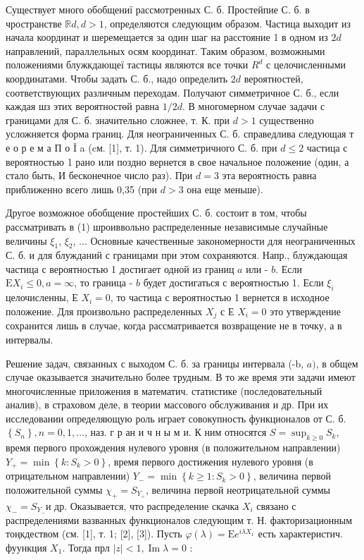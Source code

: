 \documentclass[10pt]{article}
\begin{document}
Существует много обобщениї рассмотренных С. б. Простейпие С. б. в чространстве $\mathbb{R} d, d>1$, определяются следующим образом. Частица выходит из начала координат и шеремещается за один шаг на расстояние 1 в одном из $2 d$ направлений, параллельных осям координат. Таким образом, возможными положениями блужкдающеї тастицы являются все точки $R^{d}$ с целочисленными координатами. Чтобы задать С. б., надо определить $2 d$ вероятностей, соответствующих различным переходам. Получают симметричное С. б., если каждая шз этих вероятностөй равна $1 / 2 d$. В многомерном случае задачи с границами для С. б. значительно сложнее, т. К. при $d>1$ существенно усложняется форма границ. Для неограниченных С. б. справедлива следующая т е о р е м а П о Ĭ a (cм. [1], т. 1). Для симметричного С. б. при $d \leqslant 2$ частица с вероятностью 1 рано или поздно вернется в свое начальное положение (один, а стало быть, И бесконечное число раз). При $d=3$ эта вероятность равна приближенно всего лишь 0,35 (при $d>3$ она еще меньше).



Другое возможное обобщение простейших С. б. состоит в том, чтобы рассматривать в (1) шроиввольно распределенные независимые случайные величины $\xi_{1}$, $\xi_{2}$, ... Основные качественные закономерности для неограниченных С. б. и для блужданий с границами при этом сохраняются. Напр., блуждающая частица с вероятностью 1 достигает одной из границ $a$ или - $b$. Если $\mathrm{E} X_{i} \leqslant 0, a=\infty$, то граница - $b$ будет достигаться с вероятностью 1. Если $\xi_{i}$ целочисленны, Е $X_{i}=0$, то частица с вероятностью 1 вернется в исходное положение. Для произвольно распределенных $X_{j}$ с Е $X_{i}=0$ это утверждение сохранится лишь в случае, когда рассматривается возвращение не в точку, а в интервалы.



Решение задач, связанных с выходом С. б. за границы интервала (-b, $a)$, в общем случае оказывается значительно более трудным. В то же время эти задачи имеют многочисленные приложения в математич. статистике (последовательный аналив), в страховом деле, в теории массового обслуживания и др. При их исследовании определяющую роль играет совокупность функционалов от С. б. $\left\{S_{n}\right\}, n=0,1, \ldots$, наз. г р ан и ч н ы м и. К ним относятся $S=\sup _{k \geqslant 0} S_{k}$, время первого прохождения нулевого уровня (в положительном направлении) $Y_{+}=\min \left\{k: S_{k}>0\right\}$, время первого достижения нулевого уровня (в отрицательном направлении) $Y_{-}=\min \left\{k \geqslant 1: S_{k}>0\right\}$, величина первой положительной суммы $\chi_{+}=S_{Y_{+}}$, величина первой неотрицательной суммы $\chi_{-}=S_{Y_{-}}$и др. Оказывается, что распределение скачка $X_{i}$ связано с распределениями вазванных функционалов следующим т. Н. факторизационным тоңкдеством (см. [1], т. 1; [2], [3]). Пусть $\varphi(\lambda)=\mathrm{E} e^{i \lambda X_{1}}$ есть характеристич. фуункция $X_{1}$. Тогда прл $|z|<1, \operatorname{Im} \lambda=0$ :
\end{document}
